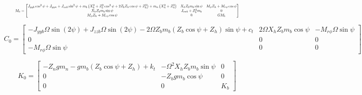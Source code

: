 \documentclass[final,onecolumn]{IEEEtran}
\begin{document}
\begin{equation}
    \label{eq:linear2_M0}
    \resizebox{0.95\textwidth}{!}{%
        $M_0 = \begin{bmatrix}
                J_{yy b} \cos^{2}{\psi} + J_{yy n} + J_{zz b} \sin^{2}{\psi} + m_{b} \left(X_{h}^{2} + Z_{b}^{2} \cos^{2}{\psi} + 2 Z_{b} Z_{h} \cos{\psi} + Z_{h}^{2}\right) + m_{n} \left(X_{n}^{2} + Z_{n}^{2}\right) & X_{h} Z_{b} m_{b} \sin{\psi} & M_{\phi} Z_{h} + M_{r\phi} \cos{\psi} \\
                X_{h} Z_{b} m_{b} \sin{\psi}                                                                                                                                                                             & J_{xx b} + Z_{b}^{2} m_{b}   & 0                                     \\
                M_{\phi} Z_{h} + M_{r\phi} \cos{\psi}                                                                                                                                                                    & 0                            & GM_{b}
            \end{bmatrix}$%
    }
\end{equation}

\begin{equation}
    \label{eq:linear2_C0}
    C_0 = \begin{bmatrix}
        - J_{yy b} \Omega \sin{(2 \psi)} + J_{zz b} \Omega \sin{(2 \psi)} - 2 \Omega Z_{b} m_{b} \left(Z_{b} \cos{\psi} + Z_{h}\right) \sin{\psi} + c_{t} & 2 \Omega X_{h} Z_{b} m_{b} \cos{\psi} & - M_{r\phi} \Omega \sin{\psi} \\
        0                                                                                                                                                 & 0                                     & 0                             \\
        - M_{r\phi} \Omega \sin{\psi}                                                                                                                     & 0                                     & 0
    \end{bmatrix}
\end{equation}

\begin{equation}
    \label{eq:linear2_K0}
    K_0 = \begin{bmatrix}
        - Z_{n} g m_{n} - g m_{b} \left(Z_{b} \cos{\psi} + Z_{h}\right) + k_{t} & - \Omega^{2} X_{h} Z_{b} m_{b} \sin{\psi} & 0     \\
        0                                                                       & - Z_{b} g m_{b} \cos{\psi}                & 0     \\
        0                                                                       & 0                                         & K_{b}
    \end{bmatrix}
\end{equation}
\end{document}
